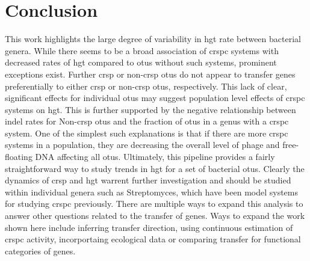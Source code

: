 \section{Conclusion}
This work highlights the large degree of variability in \ac{hgt} rate between bacterial genera.
While there seems to be a broad association of \ac{crspc} systems with decreased rates of \ac{hgt} compared to \ac{otu}s without such systems, prominent exceptions exist.
Further \ac{crsp} or non-\ac{crsp} \ac{otu}s do not appear to transfer genes preferentially to either \ac{crsp} or non-\ac{crsp} \ac{otu}s, respectively.
This lack of clear, significant effects for individual \ac{otu}s may suggest population level effects of \ac{crspc} systems on \ac{hgt}.
This is further supported by the negative relationship between indel rates for Non-\ac{crsp} \ac{otu}s and the fraction of \ac{otu}s in a genus with a \ac{crspc} system.
One of the simplest such explanations is that if there are more \ac{crspc} systems in a population, they are decreasing the overall level of phage and free-floating DNA affecting all \ac{otu}s.
Ultimately, this pipeline provides a fairly straightforward way to study trends in \ac{hgt} for a set of bacterial \ac{otu}s.
Clearly the dynamics of \ac{crsp} and \ac{hgt} warrent further investigation and should be studied within individual genera such as Streptomyces, which have been model systems for studying \ac{crspc} previously.
There are multiple ways to expand this analysis to answer other questions related to the transfer of genes.
Ways to expand the work shown here include inferring transfer direction, using continuous estimation of \ac{crspc} activity, incorportaing ecological data or comparing transfer for functional categories of genes.
